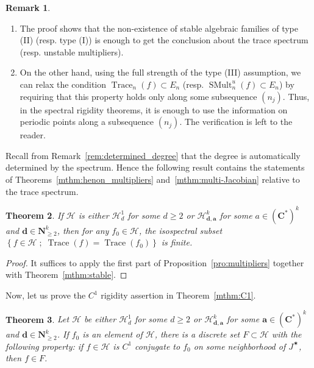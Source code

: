 \documentclass[oneside, 12pt]{amsart}
\newcommand{\set}[1]{\left\{#1\right\}}
\newcommand{\jstar}{J^\varstar}
\DeclareMathOperator{\Trace}{Trace}
\DeclareMathOperator{\SMult}{SMult}
\newcommand{\C}{\mathbf{C}}
\newcommand{\N}{\mathbf{N}}
\theoremstyle{plain}
\newtheorem{thm}{Theorem}[section]
\theoremstyle{definition}
\newtheorem{rem}[thm]{Remark}
\numberwithin{equation}{section}       %
\numberwithin{equation}{section}       %
\begin{document}
\begin{rem}\label{rem:type1}~
\begin{enumerate}[\rm (1)]
\item 
 The proof shows that
 the non-existence of  
stable algebraic families of type (II) (resp. type (I))  is enough to get the conclusion about the trace spectrum (resp. unstable multipliers).  
\item On the other hand, using the full strength of the type (III) assumption, we can relax  the condition $\Trace_n(f) \subset E_n$   (resp. $\SMult^u_n(f) \subset E_n$) by requiring that this property holds 
only along  some  subsequence $(n_j)$. 
  Thus, in the spectral rigidity theorems, it is enough to use the information on periodic points along a subsequence $(n_j)$. 
  The verification is left to the reader.
    \end{enumerate}
\end{rem}


 Recall from Remark~\ref{rem:determined_degree} that the degree is automatically determined by the spectrum. Hence 
the following result contains the statements of  Theorems~\ref{mthm:henon_multipliers} and~\ref{mthm:multi-Jacobian} relative to the trace spectrum.  
 
\begin{thm}\label{thm:traces}
If $\mathcal H$ is either $\mathcal H^1_d$ for some $d\geq 2$ or $\mathcal H^k_{\mathbf d,\mathbf a}$ for some $a\in (\C^*)^k$ and $\mathbf d\in \N^k_{\geq 2}$, then 
for any $f_0 \in \mathcal H$, the isospectral subset 
 $\set{f \in \mathcal H\; ; \;   \Trace(f ) = \Trace(f_0)}$
is finite.
\end{thm}
 
 
\begin{proof}
It suffices to apply  the first part of 
 Proposition~\ref{pro:multipliers} together with  Theorem~\ref{mthm:stable}.
 \end{proof}
 
Now, let us prove the $C^1$ rigidity assertion in  Theorem~\ref{mthm:C1}. 
 
\begin{thm}
\label{thm:C1}
Let $\mathcal H$ be either  $\mathcal H^1_d$ for some $d\geq 2$ or $\mathcal H^k_{\mathbf d,\mathbf a}$ for some $\mathbf a\in (\C^*)^k$ and $\mathbf d\in \N^k_{\geq 2}$. If $f_0$ is an element of $\mathcal H$, there is a discrete set $F\subset \mathcal H$ with the following property: if $f\in \mathcal H$ is   $C^1$ conjugate to $f_0$ on some neighborhood of $\jstar$, then $f\in F$. \end{thm}
\end{document}
